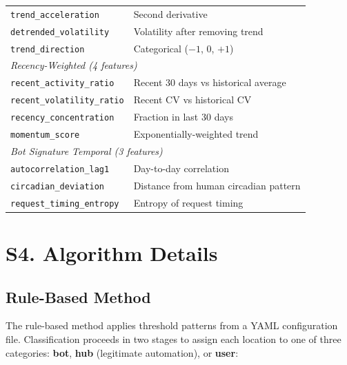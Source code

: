\documentclass[11pt,a4paper]{article}
\begin{document}
\begin{longtable}{p{5.2cm}p{9.3cm}}
\texttt{trend\_acceleration} & Second derivative \\
\texttt{detrended\_volatility} & Volatility after removing trend \\
\texttt{trend\_direction} & Categorical ($-1$, $0$, $+1$) \\
\midrule
\multicolumn{2}{l}{\textit{Recency-Weighted (4 features)}} \\
\texttt{recent\_activity\_ratio} & Recent 30 days vs historical average \\
\texttt{recent\_volatility\_ratio} & Recent CV vs historical CV \\
\texttt{recency\_concentration} & Fraction in last 30 days \\
\texttt{momentum\_score} & Exponentially-weighted trend \\
\midrule
\multicolumn{2}{l}{\textit{Bot Signature Temporal (3 features)}} \\
\texttt{autocorrelation\_lag1} & Day-to-day correlation \\
\texttt{circadian\_deviation} & Distance from human circadian pattern \\
\texttt{request\_timing\_entropy} & Entropy of request timing \\
\bottomrule
\end{longtable}

\section{S4. Algorithm Details}
\label{sec:algorithms}

\subsection{Rule-Based Method}

The rule-based method applies threshold patterns from a YAML configuration file. Classification proceeds in two stages to assign each location to one of three categories: \textbf{bot}, \textbf{hub} (legitimate automation), or \textbf{user}:
\end{document}
